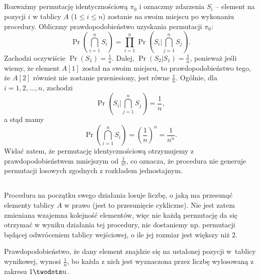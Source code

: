 \subsection{} %
\subsection{} %
Rozważmy permutację identycznościową $\pi_0$ i oznaczmy zdarzenia $S_i$ -- element na pozycji $i$ w tablicy $A$ ($1\le i\le n$) zostanie na swoim miejscu po wykonaniu procedury. Obliczmy prawdopodobieństwo uzyskania permutacji $\pi_0$:
\[
	\Pr\left(\bigcap_{i=1}^nS_i\right) = \prod_{i=1}^n\Pr\left(S_i\bigg|\bigcap_{j=1}^nS_j\right).
\]
Zachodzi oczywiście $\Pr(S_1)=\frac{1}{n}$. Dalej, $\Pr(S_2|S_1)=\frac{1}{n}$, ponieważ jeśli wiemy, że element $A[1]$ został na swoim miejscu, to prawdopodobieństwo tego, że $A[2]$ również nie zostanie przeniesiony, jest równe $\frac{1}{n}$. Ogólnie, dla $i=1,2,\dots,n$, zachodzi
\[
	\Pr\left(S_i\bigg|\bigcap_{j=1}^nS_j\right) = \frac{1}{n},
\]
a stąd mamy
\[
	\Pr\left(\bigcap_{i=1}^nS_i\right) = \left(\frac{1}{n}\right)^n = \frac{1}{n^n}.
\]
Widać zatem, że permutację identycznościową otrzymujemy z prawdopodobieństwem mniejszym od $\frac{1}{n!}$, co oznacza, że procedura  nie generuje permutacji losowych zgodnych z rozkładem jednostajnym.

\subsection{} %
Procedura na początku swego działania losuje liczbę, o jaką ma przesunąć elementy tablicy $A$ w prawo (jest to przesunięcie cykliczne). Nie jest zatem zmieniana wzajemna kolejność elementów, więc nie każdą permutację da się otrzymać w wyniku działania tej procedury, nie dostaniemy np. permutacji będącej odwróceniem tablicy wejściowej, o ile jej rozmiar jest większy niż 2.

Prawdopodobieństwo, że dany element znajdzie się na ustalonej pozycji w~tablicy wynikowej, wynosi $\frac{1}{n}$, bo każda z nich jest wyznaczona przez liczbę wylosowaną z zakresu $1\twodots n$.


